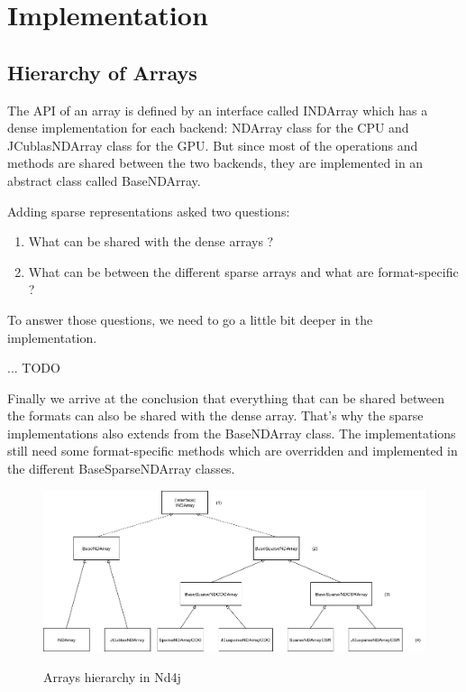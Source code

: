 \chapter{Implementation}


\section{Hierarchy of Arrays}

The API of an array is defined by an interface called INDArray which has a dense implementation for each backend: NDArray class for the CPU and JCublasNDArray class for the GPU. But since most of the operations and methods are shared between the two backends, they are implemented in an abstract class called BaseNDArray.

Adding sparse representations asked two questions:
\begin{enumerate}
 	\item What can be shared with the dense arrays ?
	\item What can be between the different sparse arrays and what are format-specific ?
\end{enumerate}

To answer those questions, we need to go a little bit deeper in the implementation. 
 
... TODO

Finally we arrive at the conclusion that everything that can be shared between the formats can also be shared with the dense array. That's why the sparse implementations also extends from the BaseNDArray class. The implementations still need some format-specific methods which are overridden and implemented in the different BaseSparseNDArray classes.
 
\begin{figure}[H]
	\begin{center}
		\includegraphics[width=6.5in]{images/INDArrayHierarchy.png} 
		\label{fig:hierarchy}
		\caption{Arrays hierarchy in Nd4j}
	\end{center}
\end{figure}

